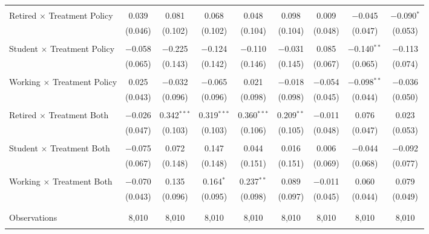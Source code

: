 \begin{tabular}{@{\extracolsep{5pt}}lcccccccc}
  & & & & & & & & \\ 
 Retired $\times$ Treatment Policy & 0.039 & 0.081 & 0.068 & 0.048 & 0.098 & 0.009 & $-$0.045 & $-$0.090$^{*}$ \\ 
  & (0.046) & (0.102) & (0.102) & (0.104) & (0.104) & (0.048) & (0.047) & (0.053) \\ 
  & & & & & & & & \\ 
 Student $\times$ Treatment Policy & $-$0.058 & $-$0.225 & $-$0.124 & $-$0.110 & $-$0.031 & 0.085 & $-$0.140$^{**}$ & $-$0.113 \\ 
  & (0.065) & (0.143) & (0.142) & (0.146) & (0.145) & (0.067) & (0.065) & (0.074) \\ 
  & & & & & & & & \\ 
 Working $\times$ Treatment Policy & 0.025 & $-$0.032 & $-$0.065 & 0.021 & $-$0.018 & $-$0.054 & $-$0.098$^{**}$ & $-$0.036 \\ 
  & (0.043) & (0.096) & (0.096) & (0.098) & (0.098) & (0.045) & (0.044) & (0.050) \\ 
  & & & & & & & & \\ 
 Retired $\times$ Treatment Both & $-$0.026 & 0.342$^{***}$ & 0.319$^{***}$ & 0.360$^{***}$ & 0.209$^{**}$ & $-$0.011 & 0.076 & 0.023 \\ 
  & (0.047) & (0.103) & (0.103) & (0.106) & (0.105) & (0.048) & (0.047) & (0.053) \\ 
  & & & & & & & & \\ 
 Student $\times$ Treatment Both & $-$0.075 & 0.072 & 0.147 & 0.044 & 0.016 & 0.006 & $-$0.044 & $-$0.092 \\ 
  & (0.067) & (0.148) & (0.148) & (0.151) & (0.151) & (0.069) & (0.068) & (0.077) \\ 
  & & & & & & & & \\ 
 Working $\times$ Treatment Both & $-$0.070 & 0.135 & 0.164$^{*}$ & 0.237$^{**}$ & 0.089 & $-$0.011 & 0.060 & 0.079 \\ 
  & (0.043) & (0.096) & (0.095) & (0.098) & (0.097) & (0.045) & (0.044) & (0.049) \\ 
  & & & & & & & & \\ 
\hline \\[-1.8ex] 

Observations & 8,010 & 8,010 & 8,010 & 8,010 & 8,010 & 8,010 & 8,010 & 8,010 \\ 
\hline 
\hline \\[-1.8ex] 
\end{tabular} 